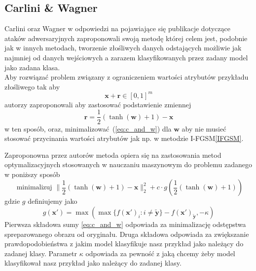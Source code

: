 \documentclass[
    left=2.5cm,         %
    right=2.5cm,        %
    top=2.5cm,          %
    bottom=3cm,         %
    bindingoffset=6mm,  %
    nohyphenation=false %
]{eiti/eiti-thesis}
\renewcommand{\vec}[1]{\mathbf{#1}}
\begin{document}
\subsection{Carlini \& Wagner}
Carlini oraz Wagner\cite{DBLP:journals/corr/CarliniW16a} w odpowiedzi na pojawiające się publikacje dotyczące
ataków adwersaryjnych zaproponowali swoją metodę której celem jest, podobnie jak w innych metodach,
tworzenie złośliwych danych
odstających możliwie jak najmniej od danych wejściowych a zarazem klasyfikowanych przez zadany model jako
zadana klasa.
\\
Aby rozwiązać problem związany z ograniczeniem wartości atrybutów przykładu złośliwego tak aby
\begin{equation}
    \vec{x}+\vec{r} \in [0,1]^m
\end{equation}
autorzy zaproponowali aby zastosować podstawienie zmiennej
\begin{equation}
    \vec{r} = \frac{1}{2}(\tanh(\vec{w})+1) - \vec{x}
\end{equation}
w ten sposób, oraz, minimalizować~(\ref{eq:c_and_w}) dla $\vec{w}$ aby nie musieć stosować przycinania wartości atrybutów jak np. w metodzie I-FGSM\ref{IFGSM}.


Zaproponowna przez autorów metoda opiera się na zastosowania metod optymalizacyjnych stosowanych w nauczaniu
maszynowym do problemu zadanego w poniższy sposób
\begin{equation}\label{eq:c_and_w}
    \text { minimalizuj } \| \frac { 1 } { 2 } ( \tanh ( \vec{w} ) + 1 ) - \vec{x} \| _ { 2 } ^ { 2 } + c \cdot g ( \frac { 1 } { 2 } ( \tanh ( \vec{w} ) + 1 ) )
\end{equation}
gdzie $g$ definiujemy jako
\begin{equation}
    g ( \vec{x'} ) = \max ( \max \{ f ( \vec{x'} ) _ { i } : i \neq \vec{\widetilde{y}} \} - f ( \vec{x'} ) _ { \vec{\widetilde{y}} } , - \kappa)
\end{equation}
Pierwsza składowa sumy \eqref{eq:c_and_w} odpowiada za minimalizację odstępstwa spreparowanego obrazu
od oryginału. Druga składowa odpowiada za zwiększanie prawdopodobieństwa z jakim model klasyfikuje nasz przykład
jako należący do zadanej klasy. Parametr \(\kappa\) odpowiada za pewność z jaką chcemy żeby model klasyfikował nasz
przykład jako należący do zadanej klasy.


\end{document}
